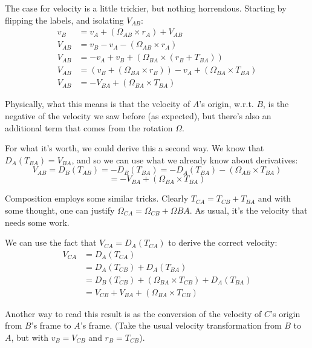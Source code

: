 \documentclass{article}
\begin{document}
The case for velocity is a little trickier, but nothing horrendous. Starting by flipping the labels, and isolating $V_{AB}$:
\begin{align*}
v_B &= v_A + (\Omega_{AB} \times r_A) + V_{AB} \\
V_{AB} &= v_B - v_A - (\Omega_{AB} \times r_A) \\
V_{AB} &= -v_A + v_B + (\Omega_{BA} \times (r_B + T_{BA})) \\
V_{AB} &= (v_B + (\Omega_{BA} \times r_B)) - v_A + (\Omega_{BA} \times T_{BA}) \\
V_{AB} &= -V_{BA} + (\Omega_{BA} \times T_{BA})
\end{align*}

Physically, what this means is that the velocity of $A$'s origin, w.r.t. $B$, is the negative of the velocity we saw before (as expected), but there's also an additional term that comes from the rotation $\Omega$.

For what it's worth, we could derive this a second way. We know that $D_A(T_{BA}) = V_{BA}$, and so we can use what we already know about derivatives:
\[ V_{AB} = D_B(T_{AB}) = -D_B(T_{BA}) = -D_A(T_{BA}) - (\Omega_{AB} \times T_{BA}) \]
\[ = -V_{BA} + (\Omega_{BA} \times T_{BA}) \]

Composition employs some similar tricks. Clearly $T_{CA} = T_{CB} + T_{BA}$ and with some thought, one can justify $\Omega_{CA} = \Omega_{CB} + \Omega{BA}$. As usual, it's the velocity that needs some work.

We can use the fact that $V_{CA} = D_A(T_{CA})$ to derive the correct velocity:
\begin{align*}
V_{CA} &= D_A(T_{CA}) \\
&= D_A(T_{CB}) + D_A(T_{BA}) \\
&= D_B(T_{CB}) + (\Omega_{BA} \times T_{CB}) + D_A(T_{BA}) \\
&= V_{CB} + V_{BA} + (\Omega_{BA} \times T_{CB})
\end{align*}

Another way to read this result is as the conversion of the velocity of $C$'s origin from $B$'s frame to $A$'s frame. (Take the usual velocity transformation from $B$ to $A$, but with $v_B = V_{CB}$ and $r_B = T_{CB}$).
\end{document}
